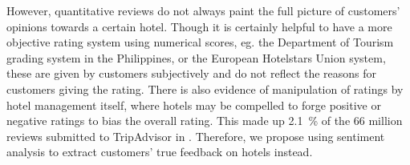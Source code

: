 \documentclass{article}
\begin{document}
However, quantitative reviews do not always paint the full picture of customers'
opinions towards a certain hotel. Though it is certainly helpful to have a more
objective rating system using numerical scores, eg. the Department of Tourism
grading system in the Philippines, or the European Hotelstars Union system,
these are given by customers subjectively and do not reflect the reasons for
customers giving the rating. There is also evidence of manipulation of ratings
by hotel management itself, where hotels may be compelled to forge positive or
negative ratings to bias the overall rating. This made up \qty{2.1}{\percent}
of the 66 million reviews submitted to TripAdvisor in \citeyear{tripadvisor}.
Therefore, we propose using sentiment analysis to extract customers' true
feedback on hotels instead.



\end{document}
